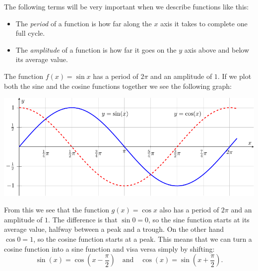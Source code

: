 The following terms will be very important when we describe functions like this:

\begin{itemize}
\item The \emph{period} of a function is how far along the $x$ axis it takes to complete one full cycle.
\item The \emph{amplitude} of a function is how far it goes on the $y$ axis above and below its average value.
\end{itemize}
The function $f(x) = \sin x$ has a period of $2 \pi$ and an amplitude of $1$.  If we plot
both the sine and the cosine functions together we see the following graph:
\begin{center}
    \includegraphics[width=0.85\columnwidth]{figures/0-5-fig6.pdf}
\end{center}
From this we see that the function $g(x) = \cos x$ also has a period of $2 \pi$ and an
amplitude of $1$.  The difference is that $\sin 0 = 0$, so the sine function starts at its
average value, halfway between a peak and a trough.  On the other hand $\cos 0 = 1$, so
the cosine function starts at a peak.  This means that we can turn a cosine function into
a sine function and visa versa simply by shifting:
\[ \sin(x) = \cos \left( x - \frac{\pi}{2} \right) \quad \text{and} \quad \cos(x) = \sin
\left( x + \frac{\pi}{2} \right). \]


